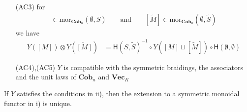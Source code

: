 \begin{cor}
\begin{enumerate}
\begin{enumerate}
\item[(AC3)]
for
\begin{align*}
  [M]
  \in
  \mathrm{mor}_{\mathbf{Cob}_{n}}(\emptyset,S)
  \qquad
  \text{and}
  \qquad
  [\tilde{M}]
  \in
  \mathrm{mor}_{\mathbf{Cob}_{n}}(\emptyset,\tilde{S})
\end{align*}
we have
\begin{align*}
  Y([M])
  \otimes
  Y(\tilde{[M]})
  &=
  \mathsf{H}(S,\tilde{S})^{-1}
  \circ
  Y([M] \sqcup [\tilde{M}])
  \circ
  \mathsf{H}(\emptyset,\emptyset)
\end{align*}

\item[(AC4),(AC5)]
$Y$ is compatible with the symmetric braidings, the associators and the unit laws of $\mathbf{Cob}_{n}$ and $\mathbf{Vec}_{K}$
\end{enumerate}
\end{enumerate}
If $Y$ satisfies the conditions in ii), then the extension to a symmetric monoidal functor in i) is unique.
\end{cor}
